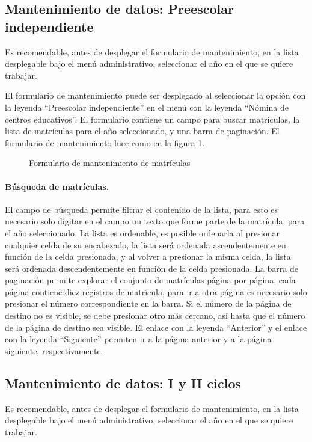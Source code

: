 \documentclass[a4paper, 9pt, conference]{article}              %
\begin{document}
\subsection{Mantenimiento de datos: Preescolar independiente}
Es recomendable, antes de desplegar el formulario de mantenimiento, en la lista desplegable bajo el men\'u administrativo, seleccionar el a\~no en el que se quiere trabajar.

El formulario de mantenimiento puede ser desplegado al seleccionar la opci\'on con la leyenda ``Preescolar independiente'' en el men\'u con la leyenda ``N\'omina de centros educativos''. El formulario contiene un campo para buscar matr\'iculas, la lista de matr\'iculas para el a\~no seleccionado, y una barra de paginaci\'on. El formulario de mantenimiento luce como en la figura \ref{fig:geoenrollments1}.

\begin{figure}
	\centering
		\caption{Formulario de mantenimiento de matr\'iculas}
	\label{fig:geoenrollments1}
\end{figure}


\paragraph{B\'usqueda de matr\'iculas.}

El campo de b\'usqueda permite filtrar el contenido de la lista, para esto es necesario solo digitar en el campo un texto que forme parte de la matr\'icula, para el a\~no seleccionado. La lista es ordenable, es posible ordenarla al presionar cualquier celda de su encabezado, la lista ser\'a ordenada ascendentemente en funci\'on de la celda presionada, y al volver a presionar la misma celda, la lista ser\'a ordenada descendentemente en funci\'on de la celda presionada. La barra de paginaci\'on permite explorar el conjunto de matr\'iculas p\'agina por p\'agina, cada p\'agina contiene diez registros de matr\'icula, para ir a otra p\'agina es necesario solo presionar el n\'umero correspondiente en la barra. Si el n\'umero de la p\'agina de destino no es visible, se debe presionar otro m\'as cercano, as\'i hasta que el n\'umero de la p\'agina de destino sea visible. El enlace con la leyenda ``Anterior'' y el enlace con la leyenda ``Siguiente'' permiten ir a la p\'agina anterior y a la p\'agina siguiente, respectivamente.


\subsection{Mantenimiento de datos: I y II ciclos}
Es recomendable, antes de desplegar el formulario de mantenimiento, en la lista desplegable bajo el men\'u administrativo, seleccionar el a\~no en el que se quiere trabajar.
\end{document}

